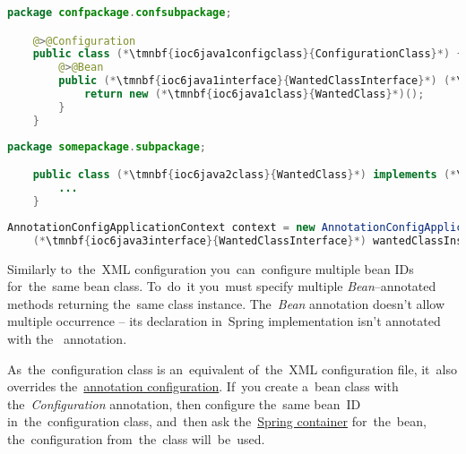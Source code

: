 \begin{lstlisting}[language=Java, title={Configuration class}]
    package confpackage.confsubpackage;

    @>@Configuration
    public class (*\tmnbf{ioc6java1configclass}{ConfigurationClass}*) {
        @>@Bean
        public (*\tmnbf{ioc6java1interface}{WantedClassInterface}*) (*\tmnbf{ioc6java1beanid}{wantedBeanMethod}*)() {
            return new (*\tmnbf{ioc6java1class}{WantedClass}*)();
        }
    }
\end{lstlisting}
\begin{lstlisting}[language=Java, title={Wanted class}]
    package somepackage.subpackage;

    public class (*\tmnbf{ioc6java2class}{WantedClass}*) implements (*\tmnbf{ioc6java2interface}{WantedClassInterface}*) {
        ...
    }
\end{lstlisting}
\begin{lstlisting}[language=Java, title={Usage}]
    AnnotationConfigApplicationContext context = new AnnotationConfigApplicationContext((*\tmnbf{ioc6java3configclass}{ConfigurationClass}*).class);
    (*\tmnbf{ioc6java3interface}{WantedClassInterface}*) wantedClassInstance = context.getBean("(*\tmnbf{ioc6java3beanid}{wantedBeanMethod}[ForestGreen]*)", (*\tmnbf{ioc6java3interface2}{WantedClassInterface}*).class);
\end{lstlisting}

\noindent Similarly to~the~XML configuration you~can~configure multiple bean IDs for~the~same bean class.
To~do~it you~must specify multiple \textit{Bean}--annotated methods returning the~same class instance.
The~\textit{Bean} annotation doesn't allow multiple occurrence -- its declaration in~Spring implementation isn't annotated with the~ annotation.

\warning As~the~configuration class is an~equivalent of~the~XML configuration file, it~also overrides the~\hyperref[iocannotations]{annotation configuration}.
If~you create a~bean class with the~\textit{Configuration} annotation, then configure the~same bean~ID in~the~configuration class, and~then ask the~\hyperref[springcontainrer]{Spring container} for~the~bean, the~configuration from~the~class will~be~used.
\newpage
